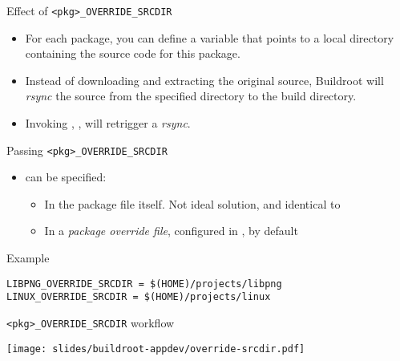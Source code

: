 \begin{frame}{Effect of {\tt <pkg>\_OVERRIDE\_SRCDIR}}
  \begin{itemize}
  \item For each package, you can define a
     variable that points to a local
    directory containing the source code for this package.
  \item Instead of downloading and extracting the original source,
    Buildroot will {\em rsync} the source from the specified directory
    to the build directory.
  \item Invoking , ,  will retrigger a
    {\em rsync}.
  \end{itemize}
\end{frame}

\begin{frame}[fragile]{Passing {\tt <pkg>\_OVERRIDE\_SRCDIR}}
  \begin{itemize}
  \item {} can be specified:
    \begin{itemize}
    \item In the package  file itself. Not ideal solution,
      and identical to 
    \item In a {\em package override file}, configured in
      , by default
    \end{itemize}
  \end{itemize}

  \begin{block}{Example }
\begin{verbatim}
LIBPNG_OVERRIDE_SRCDIR = $(HOME)/projects/libpng
LINUX_OVERRIDE_SRCDIR = $(HOME)/projects/linux
\end{verbatim}
  \end{block}
\end{frame}

\begin{frame}{{\tt <pkg>\_OVERRIDE\_SRCDIR} workflow}
  \begin{center}
    \texttt{[image: slides/buildroot-appdev/override-srcdir.pdf]}
  \end{center}
\end{frame}

